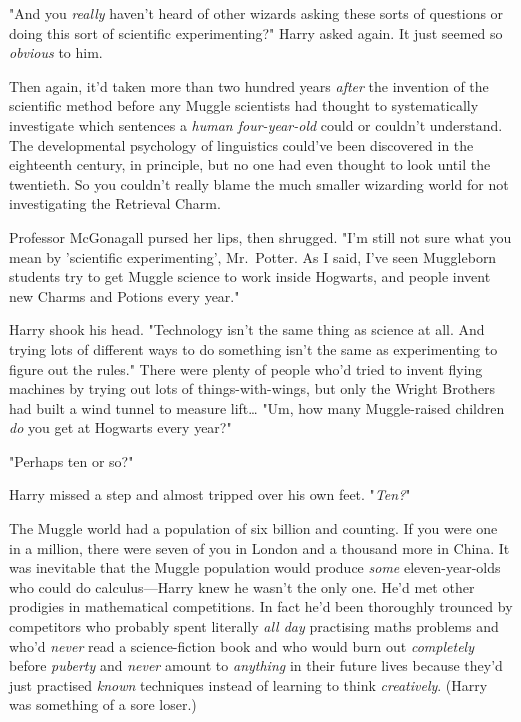 "And you \emph{really} haven't heard of other wizards asking these sorts of 
questions or doing this sort of scientific experimenting?" Harry asked again. 
It just seemed so \emph{obvious} to him.

Then again, it'd taken more than two hundred years \emph{after} the invention 
of the scientific method before any Muggle scientists had thought to 
systematically investigate which sentences a \emph{human four-year-old} could 
or couldn't understand. The developmental psychology of linguistics could've 
been discovered in the eighteenth century, in principle, but no one had even 
thought to look until the twentieth. So you couldn't really blame the much 
smaller wizarding world for not investigating the Retrieval Charm.

Professor McGonagall pursed her lips, then shrugged. "I'm still not sure what 
you mean by 'scientific experimenting', Mr.~Potter. As I said, I've seen 
Muggleborn students try to get Muggle science to work inside Hogwarts, and 
people invent new Charms and Potions every year."

Harry shook his head. "Technology isn't the same thing as science at all. And 
trying lots of different ways to do something isn't the same as experimenting 
to figure out the rules." There were plenty of people who'd tried to invent 
flying machines by trying out lots of things-with-wings, but only the Wright 
Brothers had built a wind tunnel to measure lift{\ldots} "Um, how many 
Muggle-raised children \emph{do} you get at Hogwarts every year?"

"Perhaps ten or so?"

Harry missed a step and almost tripped over his own feet. "\emph{Ten?}"

The Muggle world had a population of six billion and counting. If you were one 
in a million, there were seven of you in London and a thousand more in China. 
It was inevitable that the Muggle population would produce \emph{some} 
eleven-year-olds who could do calculus---Harry knew he wasn't the only one. 
He'd met other prodigies in mathematical competitions. In fact he'd been 
thoroughly trounced by competitors who probably spent literally \emph{all day} 
practising maths problems and who'd \emph{never} read a science-fiction book 
and who would burn out \emph{completely} before \emph{puberty} and \emph{never} 
amount to \emph{anything} in their future lives because they'd just practised 
\emph{known} techniques instead of learning to think \emph{creatively}. (Harry 
was something of a sore loser.)

